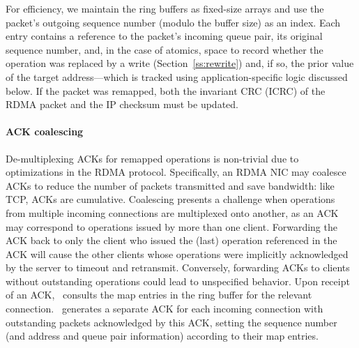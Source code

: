 For efficiency, we maintain the ring buffers as fixed-size arrays and
use the packet's outgoing sequence number (modulo the buffer size) as
an index.  Each entry contains a reference to the packet's incoming
queue pair, its original sequence number, and, in the case of atomics,
space to record whether the operation was replaced by
a write (Section~\ref{ss:rewrite}) and, if so, the prior value of the
target address---which is tracked using application-specific logic
discussed below.
%
If the packet was remapped, both the invariant CRC (ICRC) of the RDMA
packet and the IP checksum must be updated.  


\paragraph{ACK coalescing}
De-multiplexing ACKs for remapped operations is non-trivial due to
optimizations in the RDMA protocol. Specifically, an RDMA NIC may
coalesce ACKs to reduce the number of packets transmitted and save
bandwidth: like TCP, ACKs are cumulative. Coalescing presents a
challenge when operations from multiple incoming connections are
multiplexed onto another, as an ACK may correspond to operations
issued by more than one client.  Forwarding the ACK back to only the
client who issued the (last) operation referenced in the ACK will
cause the other clients whose operations were implicitly acknowledged
by the server to timeout and retransmit.  Conversely, forwarding ACKs
to clients without outstanding operations could lead to unspecified
behavior.
%
Upon receipt of an ACK, \sword\ consults the map entries in the ring
buffer for the relevant connection.  \sword\ generates a separate ACK
for each incoming connection with outstanding packets acknowledged by
this ACK, setting the sequence number (and address and queue pair
information) according to their map entries.

